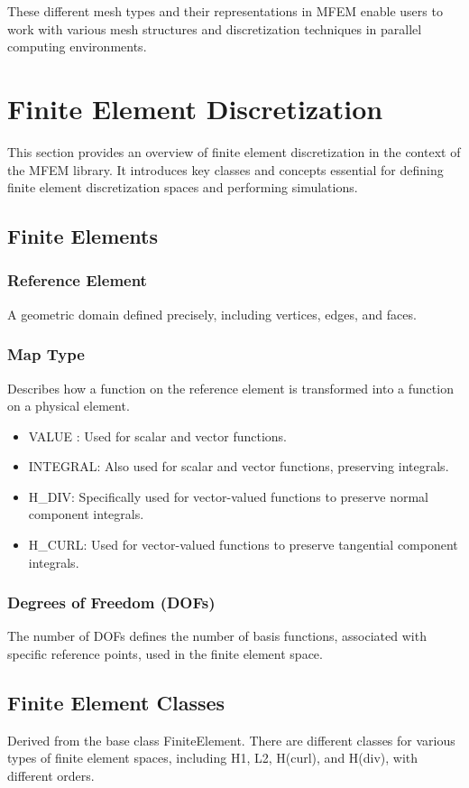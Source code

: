 \documentclass{article}
\begin{document}
These different mesh types and their representations in MFEM enable users to work with various mesh structures and discretization techniques in parallel computing environments.

\section{Finite Element Discretization}
This section provides an overview of finite element discretization in the context of the MFEM library. It introduces key classes and concepts essential for defining finite element discretization spaces and performing simulations.
\subsection{Finite Elements}
\subsubsection{Reference Element}
A geometric domain defined precisely, including vertices, edges, and faces.
\subsubsection{Map Type}
Describes how a function on the reference element is transformed into a function on a physical element.
\begin{itemize}
        \item VALUE : Used for scalar and vector functions.
        \item INTEGRAL: Also used for scalar and vector functions, preserving integrals.
        \item H\_DIV: Specifically used for vector-valued functions to preserve normal component integrals.
        \item  H\_CURL: Used for vector-valued functions to preserve tangential component integrals.
\end{itemize}
\subsubsection{Degrees of Freedom (DOFs)}
The number of DOFs defines the number of basis functions, associated with specific reference points, used in the finite element space.
\subsection{Finite Element Classes}
Derived from the base class FiniteElement. There are different classes for various types of finite element spaces, including H1, L2, H(curl), and H(div), with different orders.
\end{document}
